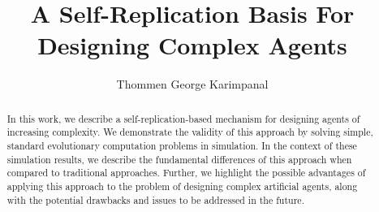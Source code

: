 \documentclass[sigconf, review=false]{acmart}
\begin{document}
\title{A Self-Replication Basis For Designing Complex Agents}




\author{Thommen George Karimpanal}
\renewcommand{\shortauthors}{Karimpanal}


\begin{abstract}
In this work, we describe a self-replication-based mechanism for designing agents of increasing complexity. We demonstrate the validity of this approach by solving simple, standard evolutionary computation problems in simulation. In the context of these simulation results, we describe the fundamental differences of this approach when compared to traditional approaches. Further, we highlight the possible advantages of applying this approach to the problem of designing complex artificial agents, along with the potential drawbacks and issues to be addressed in the future. 
\end{abstract}
%
%



\maketitle




 
\end{document}
